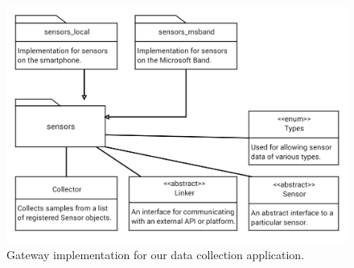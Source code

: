 \begin{figure}
	\includegraphics[width=1.0\textwidth]{../figs/gateway}
	\caption{Gateway implementation for our data collection application.}
	\label{fig:gateway}
\end{figure}
